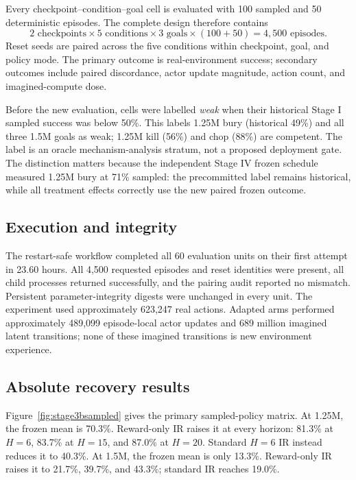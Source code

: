 \documentclass[10pt]{article}
\newcommand{\pct}[1]{#1\%}
\begin{document}
Every checkpoint--condition--goal cell is evaluated with 100 sampled and 50 deterministic episodes. The complete design therefore contains
\begin{equation}
  2\text{ checkpoints}\times5\text{ conditions}\times3\text{ goals}
  \times(100+50)=4{,}500\text{ episodes}.
\end{equation}
Reset seeds are paired across the five conditions within checkpoint, goal, and policy mode. The primary outcome is real-environment success; secondary outcomes include paired discordance, actor update magnitude, action count, and imagined-compute dose.

Before the new evaluation, cells were labelled \emph{weak} when their historical Stage I sampled success was below \pct{50}. This labels 1.25M bury (historical \pct{49}) and all three 1.5M goals as weak; 1.25M kill (\pct{56}) and chop (\pct{88}) are competent. The label is an oracle mechanism-analysis stratum, not a proposed deployment gate. The distinction matters because the independent Stage IV frozen schedule measured 1.25M bury at \pct{71} sampled: the precommitted label remains historical, while all treatment effects correctly use the new paired frozen outcome.

\subsection{Execution and integrity}

The restart-safe workflow completed all 60 evaluation units on their first attempt in 23.60 hours. All 4,500 requested episodes and reset identities were present, all child processes returned successfully, and the pairing audit reported no mismatch. Persistent parameter-integrity digests were unchanged in every unit. The experiment used approximately 623,247 real actions. Adapted arms performed approximately 489,099 episode-local actor updates and 689 million imagined latent transitions; none of these imagined transitions is new environment experience.

\subsection{Absolute recovery results}

Figure~\ref{fig:stage3bsampled} gives the primary sampled-policy matrix. At 1.25M, the frozen mean is \pct{70.3}. Reward-only IR raises it at every horizon: \pct{81.3} at $H=6$, \pct{83.7} at $H=15$, and \pct{87.0} at $H=20$. Standard $H=6$ IR instead reduces it to \pct{40.3}. At 1.5M, the frozen mean is only \pct{13.3}. Reward-only IR raises it to \pct{21.7}, \pct{39.7}, and \pct{43.3}; standard IR reaches \pct{19.0}.
\end{document}
